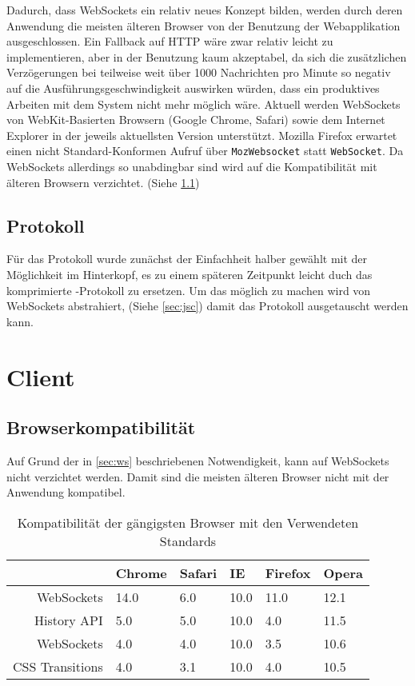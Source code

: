 Dadurch, dass WebSockets ein relativ neues Konzept bilden, werden durch deren Anwendung die meisten
älteren Browser von der Benutzung der Webapplikation ausgeschlossen. Ein Fallback auf HTTP wäre zwar
relativ leicht zu implementieren, aber in der Benutzung kaum akzeptabel, da sich die zusätzlichen
Verzögerungen bei teilweise weit über 1000 Nachrichten pro Minute so negativ auf die
Ausführungsgeschwindigkeit auswirken würden, dass ein produktives Arbeiten mit dem System nicht mehr
möglich wäre. Aktuell werden WebSockets von WebKit-Basierten Browsern (Google Chrome, Safari) sowie
dem Internet Explorer in der jeweils aktuellsten Version unterstützt. Mozilla Firefox erwartet einen
nicht Standard-Konformen Aufruf über \texttt{MozWebsocket} statt \texttt{WebSocket}. Da WebSockets
allerdings so unabdingbar sind wird auf die Kompatibilität mit älteren Browsern verzichtet. (Siehe
\ref{sec:comp})

\subsection{Protokoll}

Für das Protokoll wurde zunächst der Einfachheit halber  gewählt mit der Möglichkeit im
Hinterkopf, es zu einem späteren Zeitpunkt leicht duch das komprimierte -Protokoll zu
ersetzen. Um das möglich zu machen wird von WebSockets abstrahiert, (Siehe \ref{sec:jsc}) damit das
Protokoll ausgetauscht werden kann.

\section{Client}

\subsection{Browserkompatibilität}
\label{sec:comp}

Auf Grund der in \ref{sec:ws} beschriebenen Notwendigkeit, kann auf WebSockets nicht verzichtet
werden. Damit sind die meisten älteren Browser nicht mit der Anwendung kompatibel. 

\begin{table}
\centering
\caption{Kompatibilität der gängigsten Browser mit den Verwendeten Standards}
\begin{tabular}{rlllll}
                  & \textbf{Chrome} & \textbf{Safari} & \textbf{IE} & \textbf{Firefox} & \textbf{Opera} \\\hline
  WebSockets      & 14.0            & 6.0             & 10.0        & 11.0             & 12.1  \\
  History API     & 5.0             & 5.0             & 10.0        & 4.0              & 11.5  \\
  WebSockets      & 4.0             & 4.0             & 10.0        & 3.5              & 10.6  \\
  CSS Transitions & 4.0             & 3.1             & 10.0        & 4.0              & 10.5  \\
\end{tabular}
\label{tab:comp}
\end{table}

